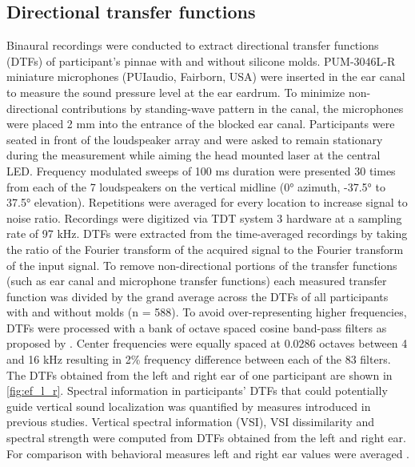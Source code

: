 \subsection{Directional transfer functions}
Binaural recordings were conducted to extract directional transfer functions (DTFs) of participant’s pinnae with and without silicone molds. PUM-3046L-R miniature microphones (PUIaudio, Fairborn, USA) were inserted in the ear canal to measure the sound pressure level at the ear eardrum. To minimize non-directional contributions by standing-wave pattern in the canal, the microphones were placed 2 mm into the entrance of the blocked ear canal. Participants were seated in front of the loudspeaker array and were asked to remain stationary during the measurement while aiming the head mounted laser at the central LED. Frequency modulated sweeps of 100 ms duration were presented 30 times from each of the 7 loudspeakers on the vertical midline (0° azimuth, -37.5° to 37.5° elevation). Repetitions were averaged for every location to increase signal to noise ratio. Recordings were digitized via TDT system 3 hardware at a sampling rate of 97 kHz. DTFs were extracted from the time-averaged recordings by taking the ratio of the Fourier transform of the acquired signal to the Fourier transform of the input signal. To remove non-directional portions of the transfer functions (such as ear canal and microphone transfer functions) each measured transfer function was divided by the grand average across the DTFs of all participants with and without molds (n = 588). To avoid over-representing higher frequencies, DTFs were processed with a bank of octave spaced cosine band-pass filters as proposed by \citet{middlebrooks_individual_1999}. Center frequencies were equally spaced at 0.0286 octaves between 4 and 16 kHz resulting in 2\% frequency difference between each of the 83 filters. The DTFs obtained from the left and right ear of one participant are shown in \cref{fig:ef_l_r}. Spectral information in participants' DTFs that could potentially guide vertical sound localization was quantified by measures introduced in previous studies. Vertical spectral information (VSI), VSI dissimilarity \citep{trapeau_fast_2016} and spectral strength \citep{andeol_sound_2013} were computed from DTFs obtained from the left and right ear. For comparison with behavioral measures left and right ear values were averaged .


